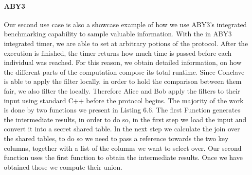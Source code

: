\paragraph{ABY3}
Our second use case is also a showcase example of how we use ABY3's integrated benchmarking capability to sample valuable information. With the in ABY3 integrated timer, we are able to set  at arbitrary potions of the protocol. After the execution is finished, the timer returns how much time is passed before each individual  was reached. For this reason, we obtain detailed information, on how the different parts of the computation compose its total runtime. Since Conclave is able to apply the filter locally, in order to hold the comparison between them fair, we also filter the locally. Therefore Alice and Bob apply the filters to their input using standard C++ before the protocol begins. The majority of the work is done by two functions we present in Listing 6.6. The first Function generates the intermediate results, in order to do so, in the first step we load the input and convert it into a secret shared table. In the next step we calculate the join over the shared tables, to do so we need to pass a reference towards the two key columns, together with a list of the columns we want to select over. Our second function uses the first function to obtain the intermediate results. Once we have obtained those we compute their union.           
